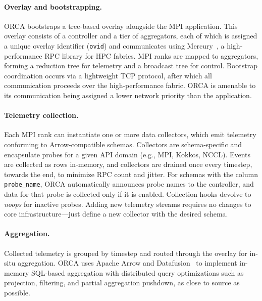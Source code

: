 \documentclass[ letterpaper, DIV=11, numbers=noendperiod]{scrartcl}
\begin{document}
\paragraph{Overlay and bootstrapping.} ORCA bootstraps a tree-based overlay
alongside the MPI application. This overlay consists of a controller
and a tier of aggregators, each of which is assigned a unique overlay identifier
(\texttt{ovid}) and communicates using Mercury~\cite{Souma2013:MercuryRPC}, a high-performance RPC library
for HPC fabrics. MPI ranks are mapped to aggregators, forming
a reduction tree for telemetry and a broadcast tree for control. Bootstrap
coordination occurs via a lightweight TCP protocol, after which all
communication proceeds over the high-performance fabric. ORCA is amenable to
its communication being assigned a lower network priority than the application.

\paragraph{Telemetry collection.} Each MPI rank can instantiate one or more
data collectors, which emit telemetry conforming to Arrow-compatible schemas.
Collectors are schema-specific and encapsulate probes for a given API domain
(e.g., MPI, Kokkos, NCCL). Events are collected as rows in-memory, and collectors
are drained once every timestep, towards the end, to minimize RPC count and jitter.
For schemas with the column \texttt{probe\_name}, ORCA automatically announces probe
names to the controller, and data for that probe is collected only if it is enabled.
Collection hooks devolve to \emph{noops} for inactive probes.
Adding new telemetry streams requires no changes to core
infrastructure---just define a new collector with the desired schema.

\paragraph{Aggregation.} Collected telemetry is grouped by timestep and routed
through the overlay for in-situ aggregation. ORCA uses Apache Arrow and
Datafusion~\cite{Lamb2024:DataFusion} to implement in-memory SQL-based aggregation with distributed query
optimizations such as projection, filtering, and partial aggregation pushdown, as close to source as possible.
\end{document}
